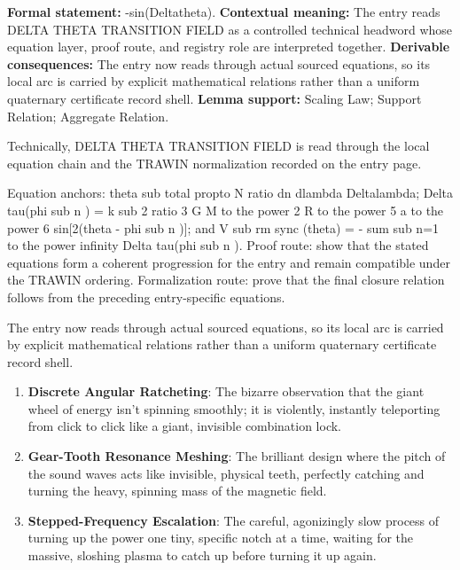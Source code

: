 \begingroup\footnotesize\setlength{\emergencystretch}{3em}\sloppy
\textbf{Formal statement:} -sin(Deltatheta). \textbf{Contextual meaning:} The entry reads DELTA THETA TRANSITION FIELD as a controlled technical headword whose equation layer, proof route, and registry role are interpreted together. \textbf{Derivable consequences:} The entry now reads through actual sourced equations, so its local arc is carried by explicit mathematical relations rather than a uniform quaternary certificate record shell. \textbf{Lemma support:} Scaling Law; Support Relation; Aggregate Relation.\par
\endgroup

Technically, DELTA THETA TRANSITION FIELD is read through the local equation chain and the TRAWIN normalization recorded on the entry page.

Equation anchors: theta sub total propto N ratio dn dlambda Deltalambda; Delta tau(phi sub n ) = k sub 2 ratio 3 G M to the power 2 R to the power 5 a to the power 6 sin[2(theta - phi sub n )]; and V sub rm sync (theta) = - sum sub n=1 to the power infinity Delta tau(phi sub n ). Proof route: show that the stated equations form a coherent progression for the entry and remain compatible under the TRAWIN ordering. Formalization route: prove that the final closure relation follows from the preceding entry-specific equations.

The entry now reads through actual sourced equations, so its local arc is carried by explicit mathematical relations rather than a uniform quaternary certificate record shell.
\endgroup

\begin{enumerate}[leftmargin=1.6em,itemsep=6pt,topsep=4pt]
\item \textbf{Discrete Angular Ratcheting}: The bizarre observation that the giant wheel of energy isn't spinning smoothly; it is violently, instantly teleporting from click to click like a giant, invisible combination lock.
\item \textbf{Gear-Tooth Resonance Meshing}: The brilliant design where the pitch of the sound waves acts like invisible, physical teeth, perfectly catching and turning the heavy, spinning mass of the magnetic field.
\item \textbf{Stepped-Frequency Escalation}: The careful, agonizingly slow process of turning up the power one tiny, specific notch at a time, waiting for the massive, sloshing plasma to catch up before turning it up again.
\end{enumerate}

